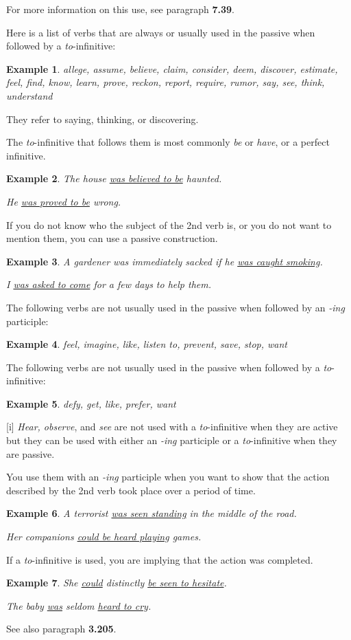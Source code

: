 \documentclass[oneside]{book}
\numberwithin{equation}{section}
\newtheorem{example}{Example}[section]
\begin{document}
For more information on this use, see paragraph \textbf{7.39}.

%
Here is a list of verbs that are always or usually used in the passive when followed by a \textit{to}-infinitive:
\begin{example}
    allege, assume, believe, claim, consider, deem, discover, estimate, feel, find, know, learn, prove, reckon, report, require, rumor, say, see, think, understand
\end{example}
They refer to saying, thinking, or discovering.

The \textit{to}-infinitive that follows them is most commonly \textit{be} or \textit{have}, or a perfect infinitive.
\begin{example}
    The house \underline{was believed to be} haunted.
    
    He \underline{was proved to be} wrong.
\end{example}
%
\noindent{} If you do not know who the subject of the 2nd verb is, or you do not want to mention them, you can use a passive construction.
\begin{example}
    A gardener was immediately sacked if he \underline{was caught smoking}.
    
    I \underline{was asked to come} for a few days to help them.
\end{example}
The following verbs are not usually used in the passive when followed by an \textit{-ing} participle:
\begin{example}
    feel, imagine, like, listen to, prevent, save, stop, want
\end{example}
The following verbs are not usually used in the passive when followed by a \textit{to}-infinitive:
\begin{example}
    defy, get, like, prefer, want
\end{example}
%
\noindent{} [i] \textit{Hear, observe}, and \textit{see} are not used with a \textit{to}-infinitive when they are active but they can be used with either an \textit{-ing} participle or a \textit{to}-infinitive when they are passive.

%
You use them with an \textit{-ing} participle when you want to show that the action described by the 2nd verb took place over a period of time.
\begin{example}
    A terrorist \underline{was seen standing} in the middle of the road.
    
    Her companions \underline{could be heard playing} games.
\end{example}
If a \textit{to}-infinitive is used, you are implying that the action was completed.
\begin{example}
    She \underline{could} distinctly \underline{be seen to hesitate}.
    
    The baby \underline{was} seldom \underline{heard to cry}.
\end{example}
See also paragraph \textbf{3.205}.
\end{document}
